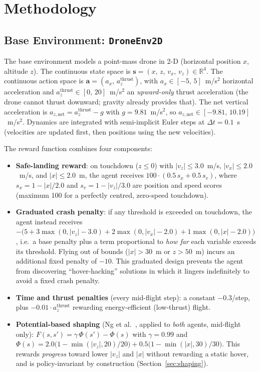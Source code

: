 \chapter{Methodology}
\label{ch:method}

\section{Base Environment: \texttt{DroneEnv2D}}
\label{sec:env_base}

The base environment models a point-mass drone in 2-D (horizontal position $x$,
altitude $z$).
The continuous state space is $\mathbf{s} = (x,\, z,\, v_x,\, v_z) \in \mathbb{R}^4$.
The continuous action space is $\mathbf{a} = (a_x,\, a_z^{\text{thrust}})$, with
$a_x \in [-5,\, 5]$~m/s$^2$ horizontal acceleration and
$a_z^{\text{thrust}} \in [0,\, 20]$~m/s$^2$ an \emph{upward-only} thrust
acceleration (the drone cannot thrust downward; gravity already provides that).
The net vertical acceleration is $a_{z,\text{net}} = a_z^{\text{thrust}} - g$
with $g = 9.81$~m/s$^2$, so $a_{z,\text{net}} \in [-9.81,\, 10.19]$~m/s$^2$.
Dynamics are integrated with semi-implicit Euler steps at $\Delta t = 0.1$~s
(velocities are updated first, then positions using the new velocities).

The reward function combines four components:
\begin{itemize}
  \item \textbf{Safe-landing reward}: on touchdown ($z \leq 0$) with
        $|v_z| \leq 3.0$~m/s, $|v_x| \leq 2.0$~m/s, and $|x| \leq 2.0$~m, the
        agent receives
        $100 \cdot (0.5\, s_x + 0.5\, s_v)$, where
        $s_x = 1 - |x|/2.0$ and $s_v = 1 - |v_z|/3.0$ are position and speed
        scores (maximum 100 for a perfectly centred, zero-speed touchdown).
  \item \textbf{Graduated crash penalty}: if any threshold is exceeded on
        touchdown, the agent instead receives
        $-\bigl(5 + 3\max(0, |v_z|-3.0) + 2\max(0, |v_x|-2.0) +
        1\max(0, |x|-2.0)\bigr)$, i.e.\ a base penalty plus a term
        proportional to \emph{how far} each variable exceeds its threshold.
        Flying out of bounds ($|x| > 30$~m or $z > 50$~m) incurs an additional
        fixed penalty of $-10$.
        This graduated design prevents the agent from discovering
        ``hover-hacking'' solutions in which it lingers indefinitely to avoid
        a fixed crash penalty.
  \item \textbf{Time and thrust penalties} (every mid-flight step):
        a constant $-0.3$/step, plus $-0.01 \cdot a_z^{\text{thrust}}$
        rewarding energy-efficient (low-thrust) flight.
  \item \textbf{Potential-based shaping} (Ng et al.~\cite{ng1999}, applied to
        \emph{both} agents, mid-flight only):
        $F(s,s') = \gamma\,\Phi(s') - \Phi(s)$ with $\gamma = 0.99$ and
        $\Phi(s) = 2.0\bigl(1 - \min(|v_z|,20)/20\bigr) +
                   0.5\bigl(1 - \min(|x|,30)/30\bigr)$.
        This rewards \emph{progress} toward lower $|v_z|$ and $|x|$ without
        rewarding a static hover, and is policy-invariant by construction
        (Section~\ref{sec:shaping}).
\end{itemize}

